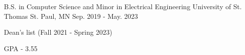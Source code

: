 
\begin{cventries}
  \cventry
    {B.S. in Computer Science and Minor in Electrical Engineering} %
    {University of St. Thomas} %
    {St. Paul, MN} %
    {Sep. 2019 - May. 2023} %
    {
      \begin{cvitems}
        \item {Dean's list (Fall 2021 - Spring 2023)}
        \item {GPA - 3.55}
      \end{cvitems}
    }
\end{cventries}

